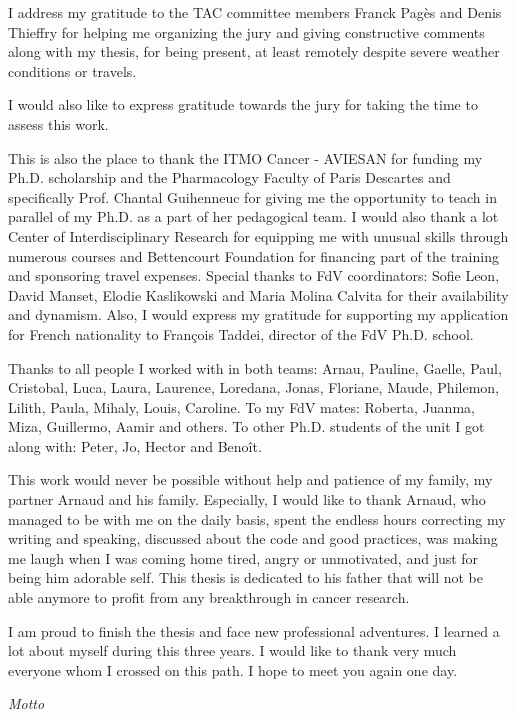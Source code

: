 \documentclass[12pt,]{book}
\theoremstyle{definition}
\theoremstyle{definition}
\theoremstyle{definition}
\theoremstyle{remark}
\begin{document}
\begin{titlepage}
I address my gratitude to the TAC committee members Franck Pagès and Denis Thieffry for helping me organizing the jury and giving constructive comments along with my thesis, for being present, at least remotely despite severe weather conditions or travels. 

I would also like to express gratitude towards the jury for taking the time to assess this work.

This is also the place to thank the ITMO Cancer - AVIESAN for funding my Ph.D. scholarship and the Pharmacology Faculty of Paris Descartes and specifically Prof. Chantal Guihenneuc for giving me the opportunity to teach in parallel of my Ph.D. as a part of her pedagogical team.  I would also thank a lot Center of Interdisciplinary Research for equipping me with unusual skills through numerous courses and Bettencourt Foundation for financing part of the training and sponsoring travel expenses. Special thanks to FdV coordinators: Sofie Leon, David Manset, Elodie Kaslikowski and Maria Molina Calvita for their availability and dynamism. Also, I would express my gratitude for supporting my application for French nationality to François Taddei, director of the FdV Ph.D. school.

Thanks to all people I worked with in both teams: Arnau, Pauline, Gaelle, Paul, Cristobal, Luca, Laura, Laurence, Loredana, Jonas, Floriane, Maude, Philemon, Lilith, Paula, Mihaly, Louis, Caroline. To my FdV mates: Roberta, Juanma, Miza, Guillermo, Aamir and others. To other Ph.D. students of the unit I got along with: Peter, Jo, Hector and Benoît.

This work would never be possible without help and patience of my family, my partner Arnaud and his family. Especially, I would like to thank Arnaud, who managed to be with me on the daily basis, spent the endless hours correcting my writing and speaking, discussed about the code and good practices, was making me laugh when I was coming home tired, angry or unmotivated, and just for being him adorable self. This thesis is dedicated to his father that will not be able anymore to profit from any breakthrough in cancer research. 

I am proud to finish the thesis and face new professional adventures. I learned a lot about myself during this three years. I would like to thank very much everyone whom I crossed on this path. I hope to meet you again one day.

\end{titlepage}

\newpage
\emph{Motto}
\vspace*{\fill}
\end{document}
